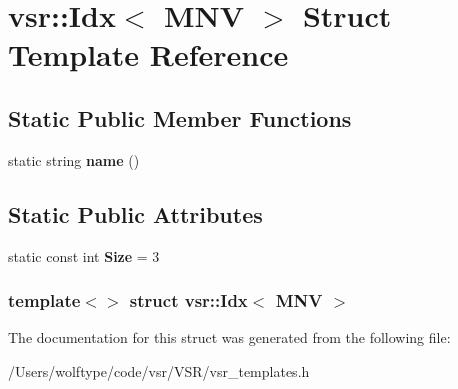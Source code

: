 \hypertarget{structvsr_1_1_idx_3_01_m_n_v_01_4}{\section{vsr\-:\-:Idx$<$ M\-N\-V $>$ Struct Template Reference}
\label{structvsr_1_1_idx_3_01_m_n_v_01_4}
}
\subsection*{Static Public Member Functions}
\begin{DoxyCompactItemize}
\item 
\hypertarget{structvsr_1_1_idx_3_01_m_n_v_01_4_ac2468b066aa29bb51960599ca5922784}{static string {\bfseries name} ()}\label{structvsr_1_1_idx_3_01_m_n_v_01_4_ac2468b066aa29bb51960599ca5922784}

\end{DoxyCompactItemize}
\subsection*{Static Public Attributes}
\begin{DoxyCompactItemize}
\item 
\hypertarget{structvsr_1_1_idx_3_01_m_n_v_01_4_ae53cceb861f09cdc9bbd3ccb5f8bfa6a}{static const int {\bfseries Size} = 3}\label{structvsr_1_1_idx_3_01_m_n_v_01_4_ae53cceb861f09cdc9bbd3ccb5f8bfa6a}

\end{DoxyCompactItemize}
\subsubsection*{template$<$$>$ struct vsr\-::\-Idx$<$ M\-N\-V $>$}



The documentation for this struct was generated from the following file\-:\begin{DoxyCompactItemize}
\item 
/\-Users/wolftype/code/vsr/\-V\-S\-R/vsr\-\_\-templates.\-h\end{DoxyCompactItemize}
